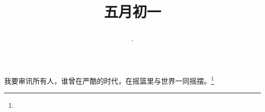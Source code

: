 \title{\date[d=6,m=6,y=2024][year:cn-y,年,month:cn,day:cn,日,·,weekday]·五月初一 }
我要审讯所有人，谁曾在严酷的时代，在摇篮里与世界一同摇摆。\footnote{ }

